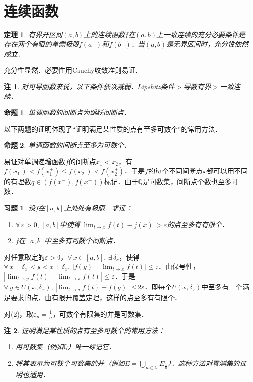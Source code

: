 \documentclass[11pt,a4paper]{ctexart}
\makeatletter
\theoremstyle{thmseries} %
\newtheorem{thm}{定理}[section]
\newtheorem{prop}{命题}[section]
\theoremstyle{exerseries}
\newtheorem{exer}{习题}[section]
\newtheorem*{rem}{注}
\renewenvironment{proof}[1][\proofname]{\par
  \pushQED{\qed}%
  \normalfont \topsep6\p@\@plus6\p@\relax
  \trivlist
  \item[\hskip\labelsep
        \itshape
    #1\@addpunct{}]\ignorespaces
}{%
  \popQED\endtrivlist\@endpefalse
}
\newenvironment{pf}{\begin{proof}[\bfseries\upshape 证\quad]}{\end{proof}}
\newcommand{\bra}[1]{\mathopen{}\left(#1\right)}
\renewcommand{\epsilon}{\varepsilon}
\newcommand{\dnei}{\overset{\circ}{U}}
\newcommand{\N}{\mathbb{N}}
\newcommand{\Q}{\mathbb{Q}}
\makeatother
\begin{document}
\section{连续函数}
\begin{thm}
	有界开区间$(a,b)$上的连续函数$f$在$(a,b)$上一致连续的充分必要条件是存在两个有限的单侧极限$f(a^+)$和$f(b^-)$．当$(a,b)$是无界区间时，充分性依然成立．
\end{thm}
\begin{pf}
	充分性显然．必要性用Cauchy收敛准则易证．
\end{pf}
\begin{rem}
	对可导函数来说，以下条件依次减弱．Lipshitz条件$>$导数有界$>$一致连续．
\end{rem}

\begin{prop}
	单调函数的间断点为跳跃间断点．
\end{prop}

以下两题的证明体现了``证明满足某性质的点有至多可数个''的常用方法．
\begin{prop}
	单调函数的间断点至多为可数个．
\end{prop}
\begin{pf}
	易证对单调递增函数$f$的间断点$x_1<x_2$，有$f(x_1^-)<f(x_1^+)\leq f(x_2^-)<f(x_2^+)$．于是$f$的每个不同间断点$x$都可以用不同的有理数$q\in\bra{f(x^-),f(x^+)}$标记．由于$\Q$是可数集，间断点个数也至多可数．
\end{pf}

\begin{exer}
	设$f$在$[a,b]$上处处有极限．求证：
	\begin{enumerate}
		\item $\forall\,\epsilon>0,\,[a,b]$中使得$|\lim_{t\to x}f(t)-f(x)|>\epsilon$的点至多有有限个．
		\item $f$在$[a,b]$中至多有可数个间断点．
	\end{enumerate}
\end{exer}
\begin{pf}
	对任意取定的$\epsilon>0$，$\forall\,x\in[a,b],\,\exists\,\delta_x$，使得$\forall\,x-\delta_x<y<x+\delta_x,\,|f(y)-\lim_{t\to x}f(t)|\leq\epsilon$．由保号性，$|\lim_{t\to y}f(t)-\lim_{t\to x}f(t)|\leq\epsilon$．于是$\forall\,y\in\dnei(x,\delta_x),\,|\lim_{t\to y}f(t)-f(y)|\leq2\epsilon$．即每个$U(x,\delta_x)$中至多有一个满足要求的点．由有限开覆盖定理，这样的点至多有有限个．

	对(2)，取$\epsilon_n=\frac{1}{n}$，可数个有限集的并是可数集．
\end{pf}
\begin{rem}
	证明满足某性质的点有至多可数个的常用方法：
	\begin{enumerate}
		\item 用可数集（例如$\Q$）唯一标记它．
		\item 将其表示为可数个可数集的并（例如$E=\bigcup_{n\in \N}E_{\frac{1}{n}}$）．这种方法对零测集的证明也适用．
	\end{enumerate}
\end{rem}
\end{document}
